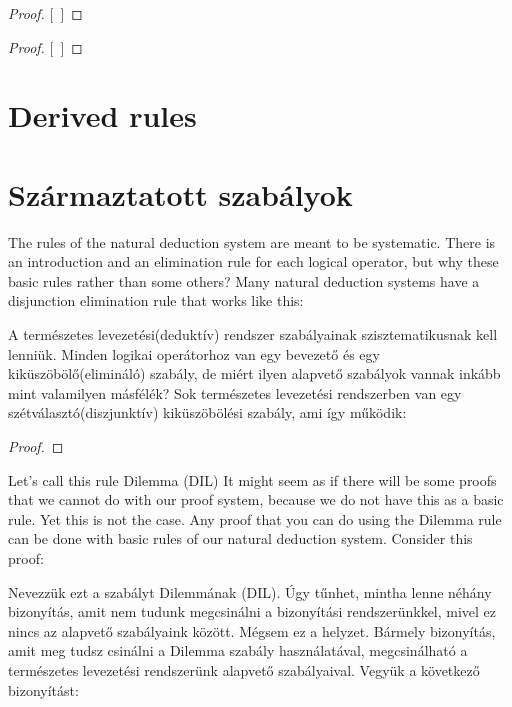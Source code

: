 \begin{proof}
\open
\close
{}[\ ]{}
\end{proof}

\begin{proof}
\open
\close
{}[\ ]{}
\end{proof}

\section*{Derived rules}
\section{Származtatott szabályok}
The rules of the natural deduction system are meant to be systematic. There is an introduction and an elimination rule for each logical operator, but why these basic rules rather than some others? Many natural deduction systems have a disjunction elimination rule that works like this:

A természetes levezetési(deduktív) rendszer szabályainak szisztematikusnak kell lenniük. Minden logikai operátorhoz van egy bevezető és egy kiküszöbölő(elimináló) szabály, de miért ilyen alapvető szabályok vannak inkább mint valamilyen másfélék? Sok természetes levezetési rendszerben van egy szétválasztó(diszjunktív) kiküszöbölési szabály, ami így működik:

\begin{proof}
	 
\end{proof}

Let's call this rule Dilemma (DIL) It might seem as if there will be some proofs that we cannot do with our proof system, because we do not have this as a basic rule. Yet this is not the case. Any proof that you can do using the Dilemma rule can be done with basic rules of our natural deduction system. Consider this proof:

Nevezzük ezt a szabályt Dilemmának (DIL). Úgy tűnhet, mintha lenne néhány bizonyítás, amit nem tudunk megcsinálni a bizonyítási rendszerünkkel, mivel ez nincs az alapvető szabályaink között. Mégsem ez a helyzet. Bármely bizonyítás, amit meg tudsz csinálni a Dilemma szabály használatával, megcsinálható a természetes levezetési rendszerünk alapvető szabályaival. Vegyük a következő bizonyítást:

